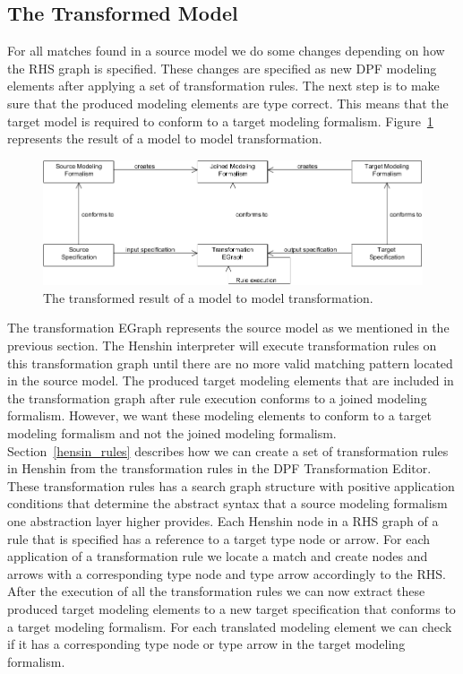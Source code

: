 \subsection{The Transformed Model}

For all matches found in a source model we do some changes depending on how the
RHS graph is specified. These changes are specified as new DPF modeling elements
after applying a set of transformation rules. The next step is to make sure that
the produced modeling elements are type correct. This means that the target
model is required to conform to a target modeling formalism.
Figure~\ref{fig:transformed_model} represents the result of a model to model
transformation.

\begin{figure}[H] 
	\centering
	\includegraphics[scale=0.7]{./Figures/Transformed_model.png}
	\caption[The transformed specification]
	{The transformed result of a model to model transformation.}
	\label{fig:transformed_model}
\end{figure}

The transformation EGraph represents the source model as we mentioned in the
previous section. The Henshin interpreter will execute transformation rules on
this transformation graph until there are no more valid matching pattern located
in the source model. The produced target modeling elements that are included in
the transformation graph after rule execution conforms to a joined modeling
formalism. However, we want these modeling elements to conform to a target
modeling formalism and not the joined modeling formalism.
Section~\ref{hensin_rules} describes how we can create a set of transformation
rules in Henshin from the transformation rules in the DPF Transformation Editor.
These transformation rules has a search graph structure with positive
application conditions that determine the abstract syntax that a source
modeling formalism one abstraction layer higher provides. Each Henshin node in a
RHS graph of a rule that is specified has a reference to a target type node or
arrow. For each application of a transformation rule we locate a match and
create nodes and arrows with a corresponding type node and type arrow
accordingly to the RHS. After the execution of all the transformation rules we
can now extract these produced target modeling elements to a new target
specification that conforms to a target modeling formalism. For each translated
modeling element we can check if it has a corresponding type node or type arrow
in the target modeling formalism. 
